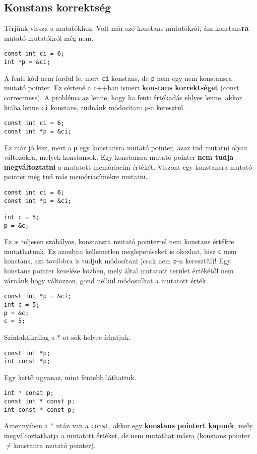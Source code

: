 \documentclass[a4paper,11.5pt,table]{article}
\begin{document}
	\subsection{Konstans korrektség}
	Térjünk vissza a mutatókhoz. Volt már szó konstans mutatókról, ám konstans\textbf{ra} mutató mutatókról még nem.
	\begin{lstlisting}
const int ci = 6;
int *p = &ci;
	\end{lstlisting}
	A fenti kód nem fordul le, mert \texttt{ci} konstans, de \texttt{p} nem egy nem konstansra mutató pointer. Ez sértené a c++ban ismert \textbf{konstans korrektséget} (const correctness). A probléma az lenne, hogy ha fenti értékadás ehlyes lenne, akkor hiába lenne \texttt{ci} konstans, tudnánk módosítani \texttt{p}-n keresztül.
	\begin{lstlisting}
const int ci = 6;
const int *p = &ci;
	\end{lstlisting}
	Ez már jó lesz, mert a \texttt{p} egy konstansra mutató pointer, azaz tud mutatni olyan változókra, melyek konstansok. Egy konstansra mutató pointer \textbf{nem tudja megváltoztatni} a mutatott memóriacím értékét. Viszont egy konstansra mutató pointer még tud más memóriacímekre mutatni.
	\begin{lstlisting}
const int ci = 6;
const int *p = &ci;

int c = 5;
p = &c;
	\end{lstlisting}
	Ez is teljesen szabályos, konstansra mutató pointerrel nem konstans értékre mutathatunk. Ez azonban kellemetlen meglepetéseket is okozhat, hisz \texttt{c} nem konstans, azt továbbra is tudjuk módosítani (csak nem \texttt{p}-n keresztül)! Egy konstans pointer kezelése közben, mely által mutatott terület értékétől nem várnánk hogy változzon, gond nélkül módosulhat a mutatott érték.
	\begin{lstlisting}
const int *p = &ci;
int c = 5;
p = &c;
c = 5;
	\end{lstlisting}
	Szintaktikailag a *-ot sok helyre írhatjuk.
	\begin{lstlisting}
const int *p;
int const *p;
	\end{lstlisting}
	Egy kettő ugyanaz, mint fentebb láthattuk.
	\begin{lstlisting}
int * const p;
const int * const p;
int const * const p;
	\end{lstlisting} 
	Amennyiben a * után van a \texttt{const}, akkor egy \textbf{konstans pointert kapunk}, mely megváltoztathatja a mutatott értéket, de nem mutathat másra (konstans pointer \quad $\not=$\quad konstanra mutató pointer).
\end{document}
